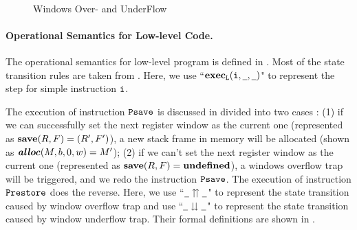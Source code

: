 \begin{figure}[!t]
\[\begin{array}{c}
{\begin{array}{c}
				\end{array}
			}
		\end{array}
    \]
    \caption{Windows Over- and UnderFlow}
    \label{fig:Windows Over- and UnderFlow}
    \vspace{-0.5em}
\end{figure}

\paragraph{\bf Operational Semantics for Low-level Code.} 
The operational semantics for low-level program is defined in 
\Fig{\ref{fig:selected-opsem-low-level-program}}. Most of the 
state transition rules are taken from 
\Fig{\ref{Selected Operational Semantics}}. Here, we use 
``$\textbf{exec}_\texttt{L}({\texttt{i}{}}, {\underline{\ \,}}, {\underline{\ \,}})$" to represent 
the step for simple instruction $\texttt{i}{}$.

The execution of instruction $\texttt{Psave}$ is discussed in divided 
into two cases : (1) if we can successfully set the next register 
window as the current one (represented as 
$\textbf{save}{(R, F)} = (R', F')$),   
a new stack frame in memory will be allocated
(shown as $\textbf{\textit{alloc}}(M, b, 0, w) = M'$); 
(2) if we can't set the next register window as the current 
one (represented as $\textbf{save}{(R, F)} = \textbf{undefined}$), 
a windows overflow trap will be triggered, and we redo the 
instruction $\texttt{Psave}$. The execution of instruction $\texttt{Prestore}$ 
does the reverse. Here, we use ``${\underline{\ \,}} \upuparrows {\underline{\ \,}}$" 
to represent the state transition caused by window overflow trap and 
use ``${\underline{\ \,}} \downdownarrows {\underline{\ \,}}$" to represent the state 
transition caused by window underflow trap. Their formal definitions 
are shown in \Fig{\ref{fig:Windows Over- and UnderFlow}}. 